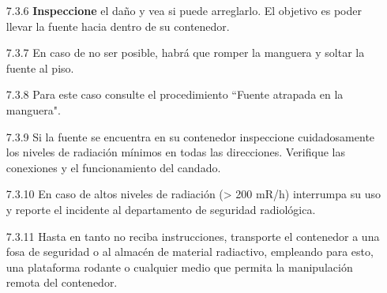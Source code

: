 \begin{itemize}
    \item[7.3.6] \textbf{Inspeccione} el daño y vea si puede arreglarlo. El objetivo es poder llevar la fuente hacia dentro de su contenedor.
    \item[7.3.7] En caso de no ser posible, habrá que romper la manguera y soltar la fuente al piso.
    \item[7.3.8] Para este caso consulte el procedimiento ``Fuente atrapada en la manguera".
    \item[7.3.9] Si la fuente se encuentra en su contenedor inspeccione cuidadosamente los niveles de radiación mínimos en todas las direcciones. Verifique las conexiones y el funcionamiento del candado.
    \item[7.3.10] En caso de altos niveles de radiación (> 200 mR/h) interrumpa su uso y reporte el incidente al departamento de seguridad radiológica.
    \item[7.3.11] Hasta en tanto no reciba instrucciones, transporte el contenedor a una fosa de seguridad o al almacén de material radiactivo, empleando para esto, una plataforma rodante o cualquier medio que permita la manipulación remota del contenedor.
\end{itemize}

